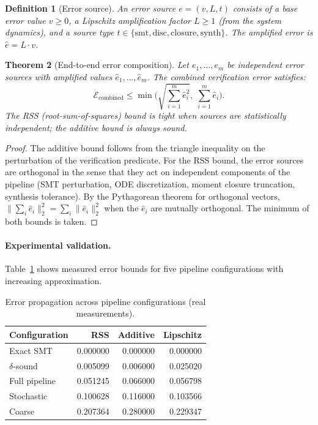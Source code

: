 \documentclass[11pt]{article}
\newtheorem{theorem}{Theorem}
\newtheorem{definition}[theorem]{Definition}
\begin{document}
\begin{definition}[Error source]
An error source $e = (v, L, t)$ consists of a base error value $v \geq 0$,
a Lipschitz amplification factor $L \geq 1$ (from the system dynamics),
and a source type $t \in \{\text{smt}, \text{disc}, \text{closure}, \text{synth}\}$.
The \emph{amplified error} is $\hat{e} = L \cdot v$.
\end{definition}

\begin{theorem}[End-to-end error composition]
\label{thm:error-compose}
Let $e_1, \ldots, e_m$ be independent error sources with amplified
values $\hat{e}_1, \ldots, \hat{e}_m$. The combined verification
error satisfies:
\begin{equation}
\mathcal{E}_{\text{combined}} \leq \min\!\Big(
  \sqrt{\sum_{i=1}^m \hat{e}_i^2},\;
  \sum_{i=1}^m \hat{e}_i
\Big).
\end{equation}
The RSS (root-sum-of-squares) bound is tight when sources are
statistically independent; the additive bound is always sound.
\end{theorem}

\begin{proof}
The additive bound follows from the triangle inequality on the
perturbation of the verification predicate. For the RSS bound,
the error sources are orthogonal in the sense that they act on
independent components of the pipeline (SMT perturbation, ODE
discretization, moment closure truncation, synthesis tolerance).
By the Pythagorean theorem for orthogonal vectors,
$\|\sum_i \hat{e}_i\|_2^2 = \sum_i \|\hat{e}_i\|_2^2$
when the $\hat{e}_i$ are mutually orthogonal. The minimum of both
bounds is taken.
\end{proof}

\paragraph{Experimental validation.}
Table~\ref{tab:error-configs} shows measured error bounds for five
pipeline configurations with increasing approximation.

\begin{table}[t]
\centering
\caption{Error propagation across pipeline configurations (real measurements).}
\label{tab:error-configs}
\small
\begin{tabular}{lrrr}
\toprule
\textbf{Configuration} & \textbf{RSS} & \textbf{Additive} & \textbf{Lipschitz} \\
\midrule
Exact SMT           & 0.000000 & 0.000000 & 0.000000 \\
$\delta$-sound      & 0.005099 & 0.006000 & 0.025020 \\
Full pipeline       & 0.051245 & 0.066000 & 0.056798 \\
Stochastic          & 0.100628 & 0.116000 & 0.103566 \\
Coarse              & 0.207364 & 0.280000 & 0.229347 \\
\bottomrule
\end{tabular}
\end{table}
\end{document}
